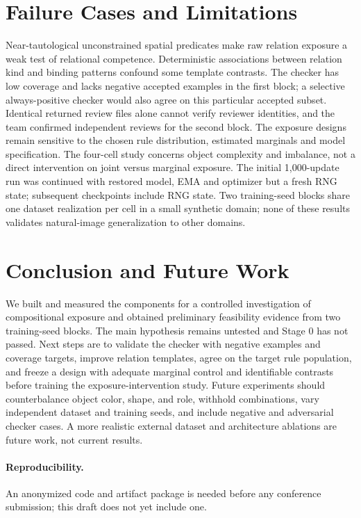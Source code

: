 \documentclass{article}
\begin{document}
\section{Failure Cases and Limitations}
Near-tautological unconstrained spatial predicates make raw relation exposure a weak test of relational competence. Deterministic associations between relation kind and binding patterns confound some template contrasts. The checker has low coverage and lacks negative accepted examples in the first block; a selective always-positive checker would also agree on this particular accepted subset. Identical returned review files alone cannot verify reviewer identities, and the team confirmed independent reviews for the second block. The exposure designs remain sensitive to the chosen rule distribution, estimated marginals and model specification. The four-cell study concerns object complexity and imbalance, not a direct intervention on joint versus marginal exposure. The initial 1,000-update run was continued with restored model, EMA and optimizer but a fresh RNG state; subsequent checkpoints include RNG state. Two training-seed blocks share one dataset realization per cell in a small synthetic domain; none of these results validates natural-image generalization to other domains.
\section{Conclusion and Future Work}
We built and measured the components for a controlled investigation of compositional exposure and obtained preliminary feasibility evidence from two training-seed blocks. The main hypothesis remains untested and Stage 0 has not passed. Next steps are to validate the checker with negative examples and coverage targets, improve relation templates, agree on the target rule population, and freeze a design with adequate marginal control and identifiable contrasts before training the exposure-intervention study. Future experiments should counterbalance object color, shape, and role, withhold combinations, vary independent dataset and training seeds, and include negative and adversarial checker cases. A more realistic external dataset and architecture ablations are future work, not current results.
\ifdefined\anonymouspaper
\paragraph{Reproducibility.} An anonymized code and artifact package is needed before any conference submission; this draft does not yet include one.
\else
\end{document}
